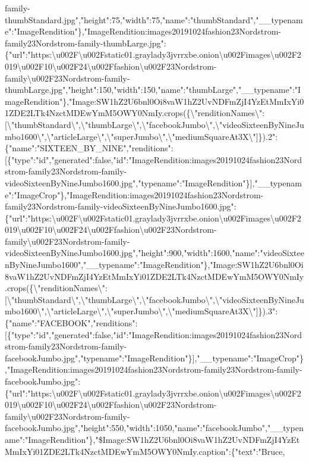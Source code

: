 family-thumbStandard.jpg","height":75,"width":75,"name":"thumbStandard","\_\_typename":"ImageRendition"\},"ImageRendition:images20191024fashion23Nordstrom-family23Nordstrom-family-thumbLarge.jpg":\{"url":"https:\textbackslash{}u002F\textbackslash{}u002Fstatic01.graylady3jvrrxbe.onion\textbackslash{}u002Fimages\textbackslash{}u002F2019\textbackslash{}u002F10\textbackslash{}u002F24\textbackslash{}u002Ffashion\textbackslash{}u002F23Nordstrom-family\textbackslash{}u002F23Nordstrom-family-thumbLarge.jpg","height":150,"width":150,"name":"thumbLarge","\_\_typename":"ImageRendition"\},"Image:SW1hZ2U6bnl0Oi8vaW1hZ2UvNDFmZjI4YzEtMmIxYi01ZDE2LTk4NzctMDEwYmM5OWY0NmIy.crops(\{\textbackslash{}"renditionNames\textbackslash{}":{[}\textbackslash{}"thumbStandard\textbackslash{}",\textbackslash{}"thumbLarge\textbackslash{}",\textbackslash{}"facebookJumbo\textbackslash{}",\textbackslash{}"videoSixteenByNineJumbo1600\textbackslash{}",\textbackslash{}"articleLarge\textbackslash{}",\textbackslash{}"superJumbo\textbackslash{}",\textbackslash{}"mediumSquareAt3X\textbackslash{}"{]}\}).2":\{"name":"SIXTEEN\_BY\_NINE","renditions":{[}\{"type":"id","generated":false,"id":"ImageRendition:images20191024fashion23Nordstrom-family23Nordstrom-family-videoSixteenByNineJumbo1600.jpg","typename":"ImageRendition"\}{]},"\_\_typename":"ImageCrop"\},"ImageRendition:images20191024fashion23Nordstrom-family23Nordstrom-family-videoSixteenByNineJumbo1600.jpg":\{"url":"https:\textbackslash{}u002F\textbackslash{}u002Fstatic01.graylady3jvrrxbe.onion\textbackslash{}u002Fimages\textbackslash{}u002F2019\textbackslash{}u002F10\textbackslash{}u002F24\textbackslash{}u002Ffashion\textbackslash{}u002F23Nordstrom-family\textbackslash{}u002F23Nordstrom-family-videoSixteenByNineJumbo1600.jpg","height":900,"width":1600,"name":"videoSixteenByNineJumbo1600","\_\_typename":"ImageRendition"\},"Image:SW1hZ2U6bnl0Oi8vaW1hZ2UvNDFmZjI4YzEtMmIxYi01ZDE2LTk4NzctMDEwYmM5OWY0NmIy.crops(\{\textbackslash{}"renditionNames\textbackslash{}":{[}\textbackslash{}"thumbStandard\textbackslash{}",\textbackslash{}"thumbLarge\textbackslash{}",\textbackslash{}"facebookJumbo\textbackslash{}",\textbackslash{}"videoSixteenByNineJumbo1600\textbackslash{}",\textbackslash{}"articleLarge\textbackslash{}",\textbackslash{}"superJumbo\textbackslash{}",\textbackslash{}"mediumSquareAt3X\textbackslash{}"{]}\}).3":\{"name":"FACEBOOK","renditions":{[}\{"type":"id","generated":false,"id":"ImageRendition:images20191024fashion23Nordstrom-family23Nordstrom-family-facebookJumbo.jpg","typename":"ImageRendition"\}{]},"\_\_typename":"ImageCrop"\},"ImageRendition:images20191024fashion23Nordstrom-family23Nordstrom-family-facebookJumbo.jpg":\{"url":"https:\textbackslash{}u002F\textbackslash{}u002Fstatic01.graylady3jvrrxbe.onion\textbackslash{}u002Fimages\textbackslash{}u002F2019\textbackslash{}u002F10\textbackslash{}u002F24\textbackslash{}u002Ffashion\textbackslash{}u002F23Nordstrom-family\textbackslash{}u002F23Nordstrom-family-facebookJumbo.jpg","height":550,"width":1050,"name":"facebookJumbo","\_\_typename":"ImageRendition"\},"\$Image:SW1hZ2U6bnl0Oi8vaW1hZ2UvNDFmZjI4YzEtMmIxYi01ZDE2LTk4NzctMDEwYmM5OWY0NmIy.caption":\{"text":"Bruce,
